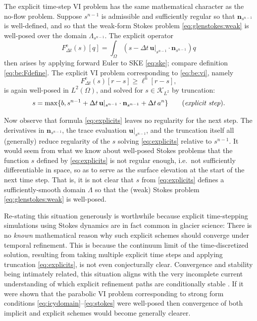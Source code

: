\documentclass[hidelinks,onefignum,onetabnum,final]{siamart220329}  %
\newcommand{\bn}{\mathbf{n}}
\newcommand{\bu}{\mathbf{u}}
\newcommand{\cK}{\mathcal{K}}
\begin{document}
The explicit time-step VI problem has the same mathematical character as the no-flow problem.  Suppose $s^{n-1}$ is admissible and sufficiently regular so that $\bn_{s^{n-1}}$ is well-defined, and so that the weak-form Stokes problem \eqref{eq:glenstokes:weak} is well-posed over the domain $\Lambda_{s^{n-1}}$.  The explicit operator
\begin{equation}
F^{\text{e}}_{\Delta t}(s)[q] = \int_\Omega \left(s - \Delta t\, \bu|_{s^{n-1}} \cdot \bn_{s^{n-1}}\right) q  \label{eq:explicitFdefine}
\end{equation}
then arises by applying forward Euler to SKE \eqref{eq:ske}; compare definition \eqref{eq:be:Fdefine}.  The explicit VI problem corresponding to \eqref{eq:be:vi}, namely
\begin{equation}
F^{\text{e}}_{\Delta t}(s)[r-s] \ge \ell^n[r-s],
\end{equation}
is again well-posed in $L^2(\Omega)$, and solved for $s \in \cK_{L^2}$ by truncation:
\begin{equation}
s = \max\{b, s^{n-1} + \Delta t\, \bu|_{s^{n-1}} \cdot \bn_{s^{n-1}} + \Delta t\,a^n\} \qquad (\text{\emph{explicit step}}). \label{eq:explicits}
\end{equation}

Now observe that formula \eqref{eq:explicits} leaves no regularity for the next step.  The derivatives in $\bn_{s^{n-1}}$, the trace evaluation $\bu|_{s^{n-1}}$, and the truncation itself all (generally) reduce regularity of the $s$ solving \eqref{eq:explicits} relative to $s^{n-1}$.  It would seem from what we know about well-posed Stokes problems that the function $s$ defined by \eqref{eq:explicits} is not regular enough, i.e.~not sufficiently differentiable in space, so as to serve as the surface elevation at the start of the next time step.  That is, it is not clear that $s$ from \eqref{eq:explicits} defines a sufficiently-smooth domain $\Lambda$ so that the (weak) Stokes problem \eqref{eq:glenstokes:weak} is well-posed.

Re-stating this situation generously is worthwhile because explicit time-stepping simulations using Stokes dynamics are in fact common in glacier science:  There is no \emph{known} mathematical reason why such explicit schemes should converge under temporal refinement.  This is because the continuum limit of the time-discretized solution, resulting from taking multiple explicit time steps and applying truncation \eqref{eq:explicits}, is not even conjecturally clear.  Convergence and stability being intimately related, this situation aligns with the very incomplete current understanding of which explicit refinement paths are conditionally stable \cite[and references therein]{Bueler2023,Chengetal2017,LofgrenAhlkronaHelanow2022}.  If it were shown that the parabolic  VI problem \cite{Glowinski1984} corresponding to strong form conditions \eqref{eq:icydomain}--\eqref{eq:stokes} were well-posed then convergence of both implicit and explicit schemes would become generally clearer.
\end{document}
